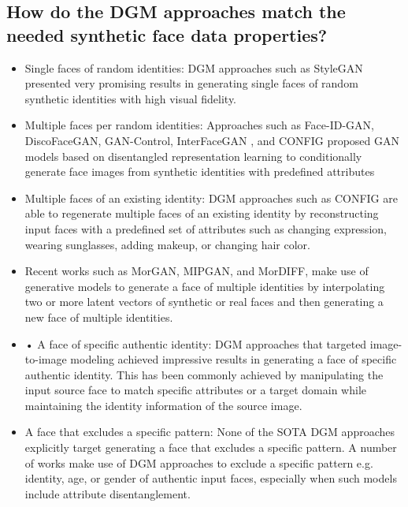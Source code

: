 \documentclass[12pt]{article}
\begin{document}
\subsection{How do the DGM approaches
match the needed synthetic face
data properties?}
\begin{itemize}
  \item Single faces of random identities: DGM approaches such as StyleGAN presented very
  promising results in generating single faces of
  random synthetic identities with high visual fidelity. 
  \item Multiple faces per random identities: Approaches such as Face-ID-GAN, DiscoFaceGAN, GAN-Control, InterFaceGAN
, and CONFIG proposed GAN models based on disentangled representation learning
  to conditionally generate face images from synthetic identities with predefined attributes 
  \item Multiple faces of an existing identity: DGM approaches such as CONFIG are able to regenerate multiple faces of an existing identity
  by reconstructing input faces with a predefined
  set of attributes such as changing expression,
  wearing sunglasses, adding makeup, or changing
  hair color.
  \item Recent works such as MorGAN, MIPGAN,
  and MorDIFF, make use of generative models to generate a face of multiple identities by
  interpolating two or more latent vectors of synthetic or real faces and then generating a new
  face of multiple identities.
  \item • A face of specific authentic identity: DGM approaches that targeted image-to-image modeling achieved impressive results in generating a
  face of specific authentic identity. This has been
  commonly achieved by manipulating the input
  source face to match specific attributes or a target domain while maintaining the identity information of the source image.
  \item A face that excludes a specific pattern: None
  of the SOTA DGM approaches explicitly target
  generating a face that excludes a specific pattern.
  A number of works make use of DGM approaches
  to exclude a specific pattern e.g. identity, age, or
  gender of authentic input faces, especially when
  such models include attribute disentanglement.
\end{itemize}
\end{document}
